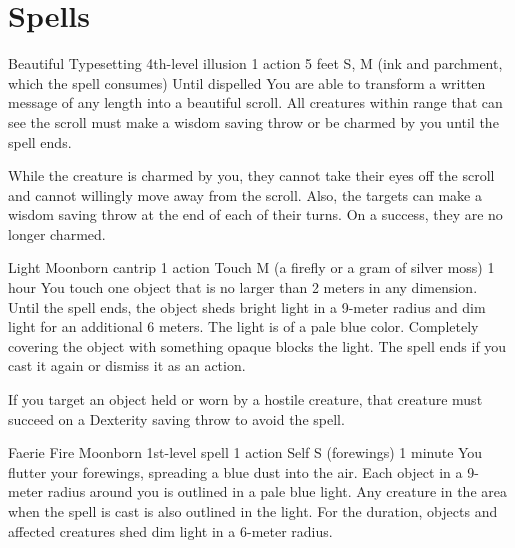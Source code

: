\chapter{Spells}
\DndSpellHeader%
    {Beautiful Typesetting}
    {4th-level illusion}
    {1 action}
    {5 feet}
    {S, M (ink and parchment, which the spell consumes)}
    {Until dispelled}
You are able to transform a written message of any length into a beautiful scroll. All creatures within range that can see the scroll must make a wisdom saving throw or be charmed by you until the spell ends.

While the creature is charmed by you, they cannot take their eyes off the scroll and cannot willingly move away from the scroll. Also, the targets can make a wisdom saving throw at the end of each of their turns. On a success, they are no longer charmed.

\DndSpellHeader %
    {Light \label{spell::light}}
    {Moonborn cantrip}
    {1 action}
    {Touch}
    {M (a firefly or a gram of silver moss)}
    {1 hour}
You touch one object that is no larger than 2 meters in any dimension.
Until the spell ends, the object sheds bright light in a 9-meter radius and dim light for an additional 6 meters.
The light is of a pale blue color.
Completely covering the object with something opaque blocks the light.
The spell ends if you cast it again or dismiss it as an action.

If you target an object held or worn by a hostile creature, that creature must succeed on a Dexterity saving throw to avoid the spell.

\DndSpellHeader %
    {Faerie Fire \label{spell::faeriefire}}
    {Moonborn 1st-level spell}
    {1 action}
    {Self}
    {S (forewings)}
    {1 minute}
You flutter your forewings, spreading a blue dust into the air.
Each object in a 9-meter radius around you is outlined in a pale blue light.
Any creature in the area when the spell is cast is also outlined in the light.
For the duration, objects and affected creatures shed dim light in a 6-meter radius.

